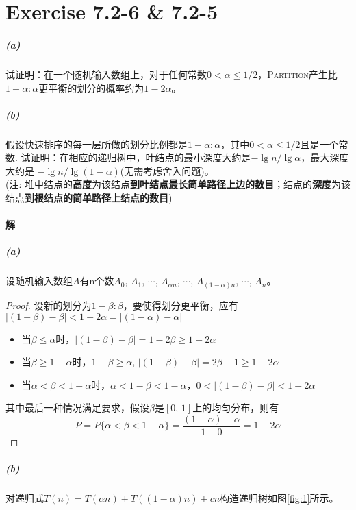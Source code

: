 \documentclass{article}
\begin{document}
\section{Exercise 7.2-6 \& 7.2-5}
\subparagraph{(a)}
试证明：在一个随机输入数组上，对于任何常数$0 < \alpha \leq 1/2$，\textsc{Partition}产生比$1−\alpha : \alpha$更平衡的划分的概率约为$1−2\alpha$。
\subparagraph{(b)}
假设快速排序的每一层所做的划分比例都是$1−\alpha : \alpha$，其中$0 < \alpha \leq 1/2$且是一个常数. 试证明：在相应的递归树中，叶结点的最小深度大约是$−\lg{n}/\lg{\alpha}$，最大深度大约是 $−\lg{n}/\lg{(1−\alpha)}$(无需考虑舍入问题)。\\
(注: 堆中结点的\textbf{高度}为该结点\textbf{到叶结点最长简单路径上边的数目}；结点的\textbf{深度}为该结点\textbf{到根结点的简单路径上结点的数目})
\\

\paragraph{解}
\subparagraph{(a)}
设随机输入数组$A$有n个数$A_0,\,A_1,\,\cdots,\,A_{\alpha n},\,\cdots,\,A_{(1 - \alpha)n},\,\cdots,\,A_n$。
\begin{proof}
设新的划分为$1 − \beta : \beta$，要使得划分更平衡，应有$|(1 - \beta) - \beta| < 1 - 2\alpha = |(1 - \alpha) - \alpha|$
\begin{itemize}

\item 当$\beta \leq \alpha$时，$|(1 - \beta) - \beta| = 1 - 2\beta \geq 1 - 2\alpha$

\item 当$\beta \geq 1 - \alpha$时，$1 - \beta \geq \alpha$, $|(1 - \beta) - \beta| = 2\beta - 1 \geq 1 - 2\alpha$

\item 当$\alpha < \beta < 1 - \alpha$时，$\alpha < 1 - \beta < 1 - \alpha$，$0<|(1 - \beta) - \beta|<1 - 2\alpha$

\end{itemize}
其中最后一种情况满足要求，假设$\beta$是$[0, \,1]$上的均匀分布，则有
\begin{equation*}
P = P\{\alpha < \beta < 1 - \alpha\}=\dfrac{(1 - \alpha) - \alpha}{1 - 0} = 1 - 2\alpha
\end{equation*}
\end{proof}
\subparagraph{(b)}
对递归式$T(n)=T(\alpha n) + T((1 - \alpha)n) + cn$构造递归树如图\ref{fig:1}所示。
\end{document}

